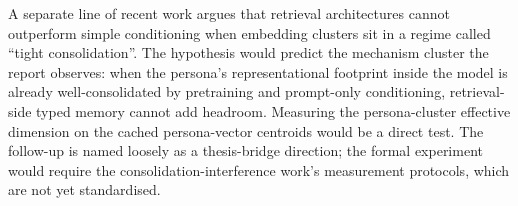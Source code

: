 A separate line of recent work argues that retrieval architectures cannot outperform simple conditioning when embedding clusters sit in a regime called ``tight consolidation''. The hypothesis would predict the mechanism cluster the report observes: when the persona's representational footprint inside the model is already well-consolidated by pretraining and prompt-only conditioning, retrieval-side typed memory cannot add headroom. Measuring the persona-cluster effective dimension on the cached persona-vector centroids would be a direct test. The follow-up is named loosely as a thesis-bridge direction; the formal experiment would require the consolidation-interference work's measurement protocols, which are not yet standardised.
